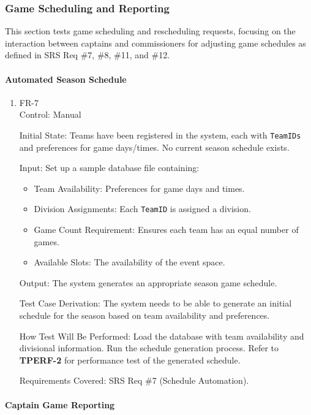 \documentclass[12pt, titlepage]{article}
\begin{document}
\subsubsection{Game Scheduling and Reporting}

This section tests game scheduling and rescheduling requests, focusing on the interaction between captains and commissioners for adjusting game schedules as defined in SRS Req \#7, \#8, \#11, and \#12.

\paragraph{Automated Season Schedule}

\begin{enumerate}

\item{FR-7\\}
Control: Manual

Initial State: Teams have been registered in the system, each with \texttt{TeamIDs} and preferences for game days/times. No current season schedule exists.

Input: 
Set up a sample database file containing:
\begin{itemize}
  \item Team Availability: Preferences for game days and times.
  \item Division Assignments: Each \texttt{TeamID} is assigned a division.
  \item Game Count Requirement: Ensures each team has an equal number of games.
  \item Available Slots: The availability of the event space.
\end{itemize}

Output: The system generates an appropriate season game schedule.

Test Case Derivation: The system needs to be able to generate an initial schedule for the season based on team availability and preferences.

How Test Will Be Performed: Load the database with team availability and divisional information. Run the schedule generation process. Refer to \textbf{TPERF-2} for performance test of the generated schedule.

Requirements Covered: SRS Req \#7 (Schedule Automation).

\end{enumerate}

\paragraph{Captain Game Reporting}
\end{document}
